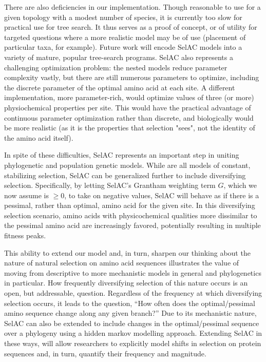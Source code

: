 \documentclass[12pt,letterpaper,fleqn]{article}
\newcommand{\PC}{physicochemical\xspace}
\newcommand{\selac}{SelAC\xspace}
\begin{document}
There are also deficiencies in our implementation. 
Though reasonable to use for a given topology with a modest number of species, it is currently too slow for practical use for tree search.
It thus serves as a proof of concept, or of utility for targeted questions where a more realistic model may be of use (placement of particular taxa, for example). 
Future work will encode \selac models into a variety of mature, popular tree-search programs. 
\selac also represents a challenging optimization problem: the nested models reduce parameter complexity vastly, but there are still numerous parameters to optimize, including the discrete parameter of the optimal amino acid at each site. 
A different implementation, more parameter-rich, would optimize values of three (or more) physiochemical properties per site. 
This would have the practical advantage of continuous parameter optimization rather than discrete, and biologically would be more realistic (as it is the properties that selection "sees", not the identity of the amino acid itself).

In spite of these difficulties, \selac represents an important step in uniting phylogenetic and population genetic models.
While \citet{KoshiEtAl1999,DimmicEtAl2000,KoshiAndGoldstein2001,RobinsonEtAl2003,LartillotAndPhilippe2004,ThorneEtAl2012,RodrigueAndLartillot2014} are all models of constant, stabilizing selection, \selac can be generalized further to include diversifying selection.
Specifically, by letting \selac's Grantham weighting term $G$, which we now assume is $\ge 0$,  to take on negative values, \selac will behave as if there is a pessimal, rather than optimal, amino acid for the given site.
In this diversifying selection scenario, amino acids with \PC qualities more dissimilar to the pessimal amino acid are increasingly favored, potentially resulting in multiple fitness peaks.

This ability to extend our model and, in turn, sharpen our thinking about the nature of natural selection on amino acid sequences illustrates the value of moving from descriptive to more mechanistic models in general and phylogenetics in particular.
How frequently diversifying selection of this nature occurs is an open, but addressable, question.
Regardless of the frequency at which diversifying selection occurs, it leads to the question, ``How often does the optimal/pessimal amino sequence change along any given branch?''
Due to its mechanistic nature, \selac can also be extended to include changes in the optimal/pessimal sequence over a  phylogeny using a hidden markov modelling approach.
Extending \selac in these ways, will allow researchers to explicitly model shifts in selection on protein sequences and, in turn, quantify their frequency and magnitude.
\end{document}
